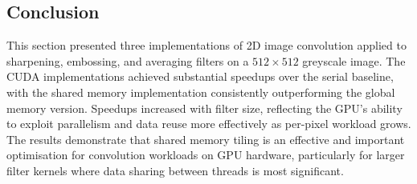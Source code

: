 \subsection{Conclusion}

This section presented three implementations of 2D image convolution applied to sharpening, embossing, and averaging filters on a $512 \times 512$ greyscale image. The CUDA implementations achieved substantial speedups over the serial baseline, with the shared memory implementation consistently outperforming the global memory version. Speedups increased with filter size, reflecting the GPU's ability to exploit parallelism and data reuse more effectively as per-pixel workload grows. The results demonstrate that shared memory tiling is an effective and important optimisation for convolution workloads on GPU hardware, particularly for larger filter kernels where data sharing between threads is most significant.


